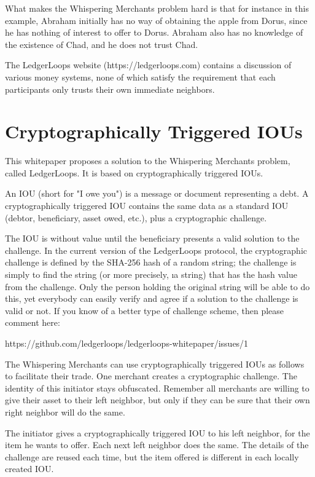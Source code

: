 \documentclass[11pt,twoside,a4paper]{article}
\begin{document}
What makes the Whispering Merchants problem hard is that for instance in this example, Abraham initially has no way of obtaining the apple from Dorus, since he has nothing of interest to offer to Dorus. Abraham also has no knowledge of the existence of Chad, and he does not trust Chad.

The LedgerLoops website (https://ledgerloops.com) contains a discussion of various money systems, none of which satisfy the requirement that each participants only trusts their own immediate neighbors.

\section{Cryptographically Triggered IOUs}
This whitepaper proposes a solution to the Whispering Merchants problem, called LedgerLoops. It is based on cryptographically triggered IOUs.

An IOU (short for "I owe you") is a message or document representing a debt.
A cryptographically triggered IOU contains the same data as a standard IOU (debtor, beneficiary, asset owed, etc.), plus a cryptographic challenge.

The IOU is without value until the beneficiary presents a valid solution to the challenge. In the current version of the LedgerLoops protocol, the cryptographic challenge is defined by the SHA-256 hash of a random string; the challenge is simply to find the string (or more precisely, {\i a} string) that has the hash value from the challenge. Only the person holding the original string will be able to do this, yet everybody can easily verify and agree if a solution to the challenge is valid or not. If you know of a better type of challenge scheme, then please comment here:

https://github.com/ledgerloops/ledgerloops-whitepaper/issues/1

The Whispering Merchants can use cryptographically triggered IOUs as follows to facilitate their trade. One merchant creates a cryptographic challenge. The identity of this initiator stays obfuscated. Remember all merchants are willing to give their asset to their left neighbor, but only if they can be sure that their own right neighbor will do the same.

The initiator gives a cryptographically triggered IOU to his left neighbor, for the item he wants to offer. Each next left neighbor does the same. The details of the challenge are reused each time, but the item offered is different in each locally created IOU.
\end{document}
